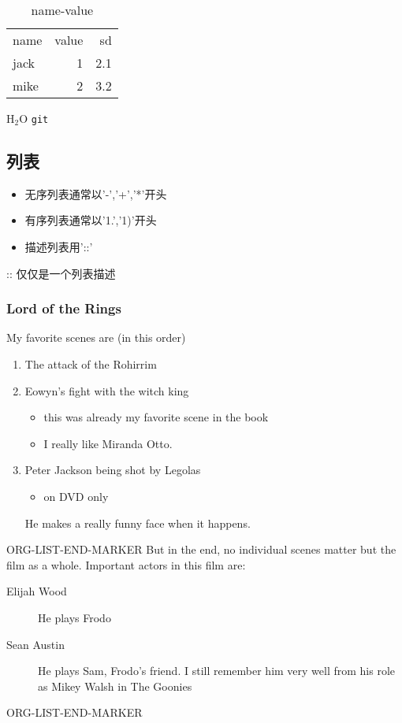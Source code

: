 \documentclass[11pt]{article}
\begin{document}
\begin{table}[htb]
\caption{name-value} \label{table1}
\begin{center}
\begin{tabular}{lrr}
 name  &  value  &   sd  \\
 jack  &      1  &  2.1  \\
 mike  &      2  &  3.2  \\
\end{tabular}
\end{center}
\end{table}



H$_{2}$O
\texttt{git}
\subsection{列表}
\label{sec-6-2}

\begin{itemize}
\item 无序列表通常以'-','+','*'开头
\item 有序列表通常以'1.','1)'开头
\item 描述列表用'::'
\end{itemize}
:: 仅仅是一个列表描述
\subsubsection{Lord of the Rings}
\label{sec-6-2-1}

   My favorite scenes are (in this order)
\begin{enumerate}
\item The attack of the Rohirrim
\item Eowyn's fight with the witch king
\begin{itemize}
\item this was already my favorite scene in the book
\item I really like Miranda Otto.
\end{itemize}
\item Peter Jackson being shot by Legolas
\begin{itemize}
\item on DVD only
\end{itemize}
He makes a really funny face when it happens.
\end{enumerate}

ORG-LIST-END-MARKER
   But in the end, no individual scenes matter but the film as a whole.
   Important actors in this film are:
\begin{description}
\item[Elijah Wood] He plays Frodo
\item[Sean Austin] He plays Sam, Frodo's friend.  I still remember
     him very well from his role as Mikey Walsh in The Goonies
\end{description}
ORG-LIST-END-MARKER
\end{document}
